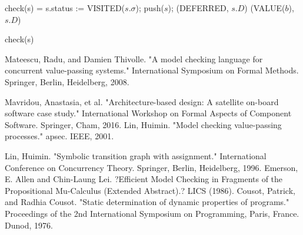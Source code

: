 \documentclass[runningheads,a4paper]{llncs}
\begin{document}
\begin{algorithm} 
	\begin{algorithmic}[1]
		\State check(s) =
		\State s.status := VISITED($s.\sigma$); push($s$); \Return (DEFERRED, $s.D$)
		\EndCase
		\Return (VALUE($b$), $s.D$)
		\EndCase
		\EndSwitch
		
	\end{algorithmic} 
	\caption{check(s)}
	\label{alg:algorithm2}
\end{algorithm}





\begin{thebibliography}{4}
	
	Mateescu, Radu, and Damien Thivolle. "A model checking language for concurrent value-passing systems." International Symposium on Formal Methods. Springer, Berlin, Heidelberg, 2008.
	
	 Mavridou, Anastasia, et al. "Architecture-based design: A satellite on-board software case study." International Workshop on Formal Aspects of Component Software. Springer, Cham, 2016.
	 Lin, Huimin. "Model checking value-passing processes." apsec. IEEE, 2001.

	 Lin, Huimin. "Symbolic transition graph with assignment." International Conference on Concurrency Theory. Springer, Berlin, Heidelberg, 1996.
	Emerson, E. Allen and Chin-Laung Lei. ?Efficient Model Checking in Fragments of the Propositional Mu-Calculus (Extended Abstract).? LICS (1986).
	Cousot, Patrick, and Radhia Cousot. "Static determination of dynamic properties of programs." Proceedings of the 2nd International Symposium on Programming, Paris, France. Dunod, 1976.
	
\end{thebibliography}
\end{document}
